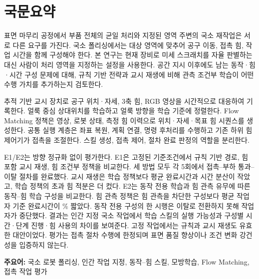 \chapter*{국문요약}
\begin{center}\large\bfseries\thesistitlekr\end{center}

표면 마무리 공정에서 부품 전체의 균일 처리와 지정된 영역 주변의 국소 재작업은 서로 다른 요구를 가진다. 국소 폴리싱에서는 대상 영역에 맞추어 공구 이동, 접촉 힘, 작업 시간을 함께 구성해야 한다. 본 연구는 현재 장비로 미세 스크래치를 자율 판별하는 대신 사람이 처리 영역을 지정하는 설정을 사용한다. 공간 지시 이후에도 남는 동작·힘·시간 구성 문제에 대해, 규칙 기반 전략과 교시 재생에 비해 관측 조건부 학습이 어떤 수행 가치를 추가하는지 검토한다.

추적 기반 교시 장치로 공구 위치·자세, 3축 힘, RGB 영상을 시간적으로 대응하여 기록한다. 얼룩 중심 상대위치를 학습하고 얼룩 방향을 학습 기준에 정렬한다. Flow Matching 정책은 영상, 로봇 상태, 측정 힘 이력으로 위치·자세·목표 힘 시퀀스를 생성한다. 공통 실행 계층은 좌표 복원, 계획 연결, 명령 후처리를 수행하고 기존 하위 힘제어기가 접촉을 조절한다. 스킬 생성, 접촉 제어, 절차 완료 판정의 역할을 분리한다.

E1/E2는 방향 정규화 없이 평가한다. E1은 고정된 기준조건에서 규칙 기반 경로, 힘 포함 교시 재생, 힘 조건부 정책을 비교한다. 세 방법 모두 각 5회에서 접촉--부하 통과--이탈 절차를 완료했다. 교시 재생은 학습 정책보다 평균 완료시간과 시간 분산이 작았고, 학습 정책의 초과 힘 적분은 더 컸다. E2는 동작 전용 학습과 힘 관측 유무에 따른 동작--힘 학습 구성을 비교한다. 힘 관측 정책은 힘 관측을 차단한 구성보다 평균 작업자 기준 완료시간이 \BCPercent\% 짧았다. 동작 전용 구성의 한 시행은 이탈로 전환하지 못해 작업자가 중단했다. 결과는 인간 지정 국소 작업에서 학습 스킬의 실행 가능성과 구성별 시간·단계 진행·힘 사용의 차이를 보여준다. 고정 작업에서는 규칙과 교시 재생도 유효한 대안이었다. 평가는 접촉 절차 수행에 한정되며 표면 품질 향상이나 조건 변화 강건성을 입증하지 않는다.

\vspace{0.4cm}
\noindent\textbf{주요어:} 국소 로봇 폴리싱, 인간 작업 지정, 동작--힘 스킬, 모방학습, Flow Matching, 접촉 작업 평가
